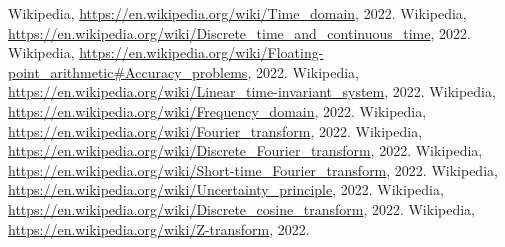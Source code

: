 \clearpage
{}
\begin{thebibliography}{9}
         Wikipedia, \underline{https://en.wikipedia.org/wiki/Time\_domain}, 2022.
         Wikipedia, \underline{https://en.wikipedia.org/wiki/Discrete\_time\_and\_continuous\_time}, 2022.
         Wikipedia, \underline{https://en.wikipedia.org/wiki/Floating-point\_arithmetic\#Accuracy\_problems}, 2022.
         Wikipedia, \underline{https://en.wikipedia.org/wiki/Linear\_time-invariant\_system}, 2022.
         Wikipedia, \underline{https://en.wikipedia.org/wiki/Frequency\_domain}, 2022.
         Wikipedia, \underline{https://en.wikipedia.org/wiki/Fourier\_transform}, 2022.
         Wikipedia, \underline{https://en.wikipedia.org/wiki/Discrete\_Fourier\_transform}, 2022.
         Wikipedia, \underline{https://en.wikipedia.org/wiki/Short-time\_Fourier\_transform}, 2022.
         Wikipedia, \underline{https://en.wikipedia.org/wiki/Uncertainty\_principle}, 2022.
         Wikipedia, \underline{https://en.wikipedia.org/wiki/Discrete\_cosine\_transform}, 2022.
         Wikipedia, \underline{https://en.wikipedia.org/wiki/Z-transform}, 2022.
\end{thebibliography}

